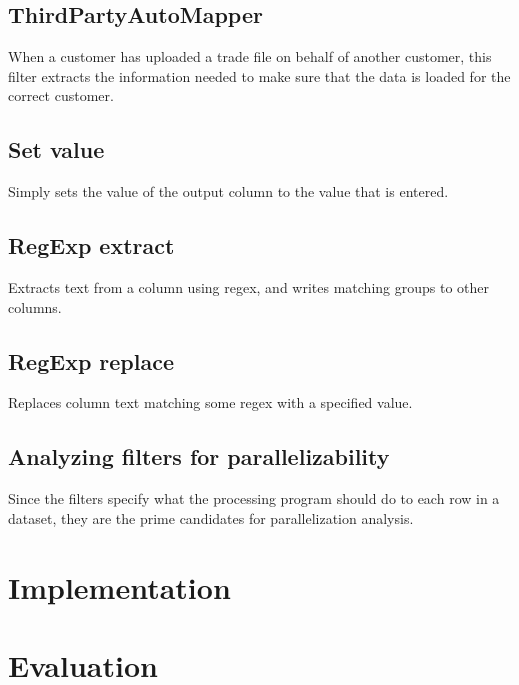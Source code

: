 \subsection{ThirdPartyAutoMapper}
When a customer has uploaded a trade file on behalf of another customer, this filter extracts the information needed to make sure that the data is loaded
for the correct customer.

\subsection{Set value}
Simply sets the value of the output column to the value that is entered.

\subsection{RegExp extract}
Extracts text from a column using regex, and writes matching groups to other columns.

\subsection{RegExp replace}
Replaces column text matching some regex with a specified value.

\subsection{Analyzing filters for parallelizability}
Since the filters specify what the processing program should do to each row in a dataset, they are the prime candidates for parallelization analysis.

\section{Implementation}

\section{Evaluation}
